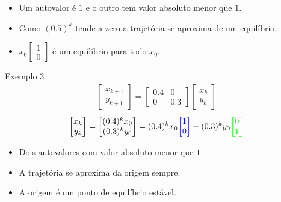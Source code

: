 \documentclass{beamer}
\begin{document}
\begin{frame}
  \begin{itemize}
    \item Um autovalor é $1$ e o outro tem valor absoluto menor que $1$.
    \item Como $(0.5)^k$ tende a zero a trajetória se aproxima de um equilíbrio.
    \item $x_0\begin{bmatrix}
      1 \\ 0
    \end{bmatrix}$ é um equilíbrio para todo $x_0$.
  \end{itemize}
\end{frame}
\begin{frame}{Exemplo 3}
  \begin{gather*}
    \begin{bmatrix}
      x_{k+1} \\ y_{k+1} 
    \end{bmatrix} = \begin{bmatrix}
      0.4 & 0 \\ 0 & 0.3
    \end{bmatrix}\begin{bmatrix}
      x_k \\ y_k
    \end{bmatrix}
  \end{gather*}
  \begin{gather*}
  \begin{bmatrix}
    x_k \\ y_k 
  \end{bmatrix} =\begin{bmatrix}
    (0.4)^kx_0 \\ (0.3)^k y_0
  \end{bmatrix} = (0.4)^k x_0\textcolor{blue}{\begin{bmatrix}
    1 \\ 0
  \end{bmatrix}} + (0.3)^k y_0 \textcolor{green}{\begin{bmatrix}
    0 \\ 1
  \end{bmatrix}}
\end{gather*}
  
\end{frame}
\begin{frame}
  \begin{itemize}
    \item Dois autovalores com valor absoluto menor que $1$
    \item A trajetória se aproxima da origem sempre.
    \item A origem é um ponto de equilíbrio estável.
  \end{itemize}
\end{frame}
\end{document}
